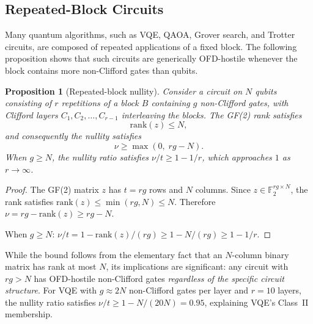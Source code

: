 \documentclass[a4paper,twocolumn,11pt]{quantumarticle}
\newtheorem{proposition}[theorem]{Proposition}
\begin{document}
\subsection{Repeated-Block Circuits}
\label{sec:repeated_block}

Many quantum algorithms, such as VQE, QAOA, Grover search, and Trotter circuits, are composed of repeated applications of a fixed block.
The following proposition shows that such circuits are generically OFD-hostile whenever the block contains more non-Clifford gates than qubits.

\begin{proposition}[Repeated-block nullity]
\label{prop:repeated_block}
Consider a circuit on $N$ qubits consisting of $r$ repetitions of a block $B$ containing $g$ non-Clifford gates, with Clifford layers $C_1, C_2, \ldots, C_{r-1}$ interleaving the blocks.
The GF(2) rank satisfies
\begin{equation}
\label{eq:rank_upper}
\mathrm{rank}(z) \le N,
\end{equation}
and consequently the nullity satisfies
\begin{equation}
\label{eq:repeated_nullity}
\nu \ge \max(0,\; rg - N).
\end{equation}
When $g \ge N$, the nullity ratio satisfies $\nu/t \ge 1 - 1/r$, which approaches $1$ as $r \to \infty$.
\end{proposition}

\begin{proof}
The GF(2) matrix $z$ has $t = rg$ rows and $N$ columns.
Since $z \in \mathbb{F}_2^{rg \times N}$, the rank satisfies $\mathrm{rank}(z) \le \min(rg, N) \le N$.
Therefore $\nu = rg - \mathrm{rank}(z) \ge rg - N$.

When $g \ge N$: $\nu/t = 1 - \mathrm{rank}(z)/(rg) \ge 1 - N/(rg) \ge 1 - 1/r$.
\end{proof}

While the bound follows from the elementary fact that an $N$-column binary matrix has rank at most $N$, its implications are significant: any circuit with $rg > N$ has OFD-hostile non-Clifford gates \emph{regardless of the specific circuit structure}.
For VQE with $g \approx 2N$ non-Clifford gates per layer and $r = 10$ layers, the nullity ratio satisfies $\nu/t \ge 1 - N/(20N) = 0.95$, explaining VQE's Class~II membership.
\end{document}
